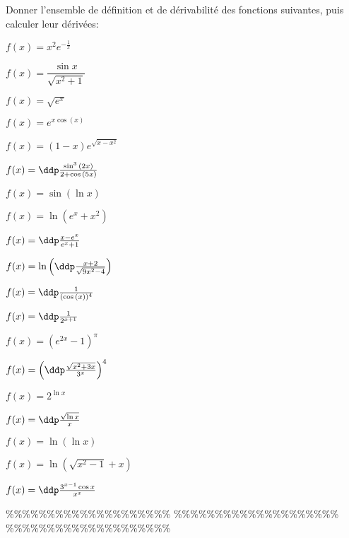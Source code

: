



\begin{exercice}  \; Donner l'ensemble de d\'efinition et de d\'erivabilit\'e des fonctions suivantes, puis calculer leur d\'eriv\'ees:
\begin{enumerate}
\begin{minipage}[t]{0.27\textwidth}
\item $f(x)=x^2e^{-\frac{1}{x}}$
\item $f(x)=\dfrac{\sin x}{\sqrt{x^2+1}}$
\item $f(x)=\sqrt{e^x}$
\item $f(x)=e^{x\cos{(x)}}$
\item $f(x)=(1-x)e^{\sqrt{x-x^2}}$\item $f(x)=\ddp\frac{\sin^3{(2x)}}{2+\cos{(5x)}}$
\item $f(x)=\sin{(\ln{x})}$
\end{minipage}
\begin{minipage}[t]{0.3\textwidth}
\item $f(x) =\ln(e^x+x^2)$
\item $f(x)=\ddp\frac{x-e^x}{e^x+1}$
\item $f(x)=\ln{\left(  \ddp\frac{x+2}{\sqrt{9x^2-4}} \right)}$
\item $f(x)=\ddp\frac{1}{(\cos{(x)})^4}$
\item $f(x)=\ddp\frac{1}{2^{x+1}}$
\item $f(x)=(e^{2x}-1)^{\pi}$
\end{minipage}
\begin{minipage}[t]{0.3\textwidth}
\item $f(x)=\left(  \ddp\frac{\sqrt{x^2+3x}}{3^x} \right)^4$
\item $f(x)=2^{\ln{x}}$
\item $f(x)=\ddp\frac{\sqrt{\ln{x}}}{x}$
\item $f(x)=\ln{(\ln{x})}$
\item $f(x)=\ln{(\sqrt{x^2-1}+x)}$
\item $f(x)=\ddp\frac{3^{x-1}\cos{x}}{x^x}$
\end{minipage}
\end{enumerate}
\end{exercice}


\%\%\%\%\%\%\%\%\%\%\%\%\%\%\%\%\%\%\%\%
\%\%\%\%\%\%\%\%\%\%\%\%\%\%\%\%\%\%\%\%
\%\%\%\%\%\%\%\%\%\%\%\%\%\%\%\%\%\%\%\%



